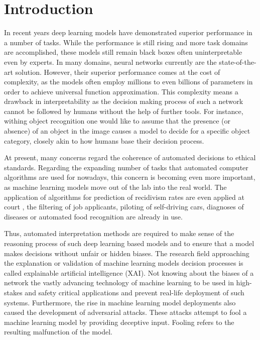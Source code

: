 \section{Introduction}
\label{sec:introduction}

In recent years deep learning models have demonstrated superior performance in a number of tasks. While the performance is still rising and more task domains are accomplished, these models still remain black boxes often uninterpretable even by experts. 
In many domains, neural networks currently are the state-of-the-art solution. However, their superior performance comes at the cost of complexity, as the models often employ millions to even billions of parameters in order to achieve universal function approximation. This complexity means a drawback in interpretability as the decision making process of such a network cannot be followed by humans without the help of further tools. For instance, withing object recognition one would like to assume that the presence (or absence) of an object in the image causes a model to decide for a specific object category, closely akin to how humans base their decision process. 

At present, many concerns regard the coherence of automated decisions to ethical standards. Regarding the expanding number of tasks that automated computer algorithms are used for nowadays, this concern is becoming even more important, as machine learning models move out of the lab into the real world. The application of algorithms for prediction of recidivism rates are even applied at court \cite{chouldechova2017fair}, the filtering of job applicants, piloting of self-driving cars, diagnoses of diseases or automated food recognition \cite{ruede2020multi} are already in use.





Thus, automated interpretation methods are required to make sense of the reasoning process of such deep learning based models and to ensure that a model makes decisions without unfair or hidden biases. 
The research field approaching the explanation or validation of machine learning models decision processes is called explainable artificial intelligence (XAI).
Not knowing about the biases of a network the vastly advancing technology of machine learning to be used in high-stakes and safety critical applications and prevent real-life deployment of such systems. 
Furthermore, the rise in machine learning model deployments also caused the development of adversarial attacks. These attacks attempt to fool a machine learning model by providing deceptive input. Fooling refers to the resulting malfunction of the model. 

